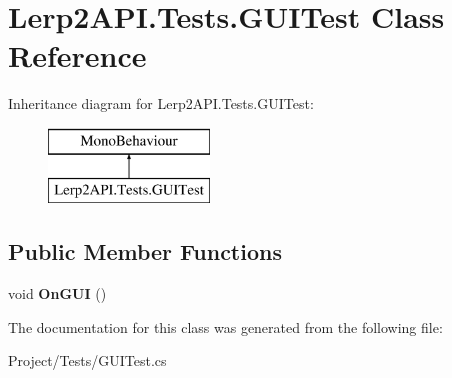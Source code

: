 \hypertarget{class_lerp2_a_p_i_1_1_tests_1_1_g_u_i_test}{}\section{Lerp2\+A\+P\+I.\+Tests.\+G\+U\+I\+Test Class Reference}
\label{class_lerp2_a_p_i_1_1_tests_1_1_g_u_i_test}
Inheritance diagram for Lerp2\+A\+P\+I.\+Tests.\+G\+U\+I\+Test\+:\begin{figure}[H]
\begin{center}
\leavevmode
\includegraphics[height=2.000000cm]{class_lerp2_a_p_i_1_1_tests_1_1_g_u_i_test}
\end{center}
\end{figure}
\subsection*{Public Member Functions}
\begin{DoxyCompactItemize}
\item 
\mbox{\label{class_lerp2_a_p_i_1_1_tests_1_1_g_u_i_test_ac2702665896e01cc25b7ec91fd6c4f74}} 
void {\bfseries On\+G\+UI} ()
\end{DoxyCompactItemize}


The documentation for this class was generated from the following file\+:\begin{DoxyCompactItemize}
\item 
Project/\+Tests/G\+U\+I\+Test.\+cs\end{DoxyCompactItemize}
